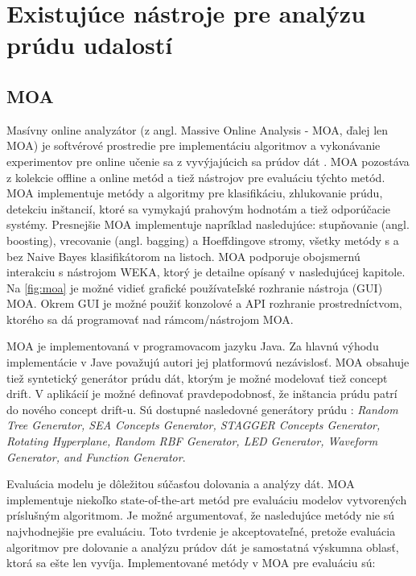 \chapter{Existujúce nástroje pre analýzu prúdu udalostí}
\label{Existujúce nástroje pre analýzu prúdu udalostí}


\section{MOA}
Masívny online analyzátor (z angl. Massive Online Analysis - MOA, ďalej len MOA) je softvérové prostredie pre implementáciu algoritmov a vykonávanie experimentov pre online učenie sa z vyvýjajúcich sa prúdov dát \citep{DBLP:journals/jmlr/BifetHKP10}. MOA pozostáva z kolekcie offline a online metód a tiež nástrojov pre evaluáciu týchto metód. MOA implementuje metódy a algoritmy pre klasifikáciu, zhlukovanie prúdu, detekciu inštancií, ktoré sa vymykajú prahovým hodnotám a tiež odporúčacie systémy. Presnejšie MOA implementuje napríklad nasledujúce: stupňovanie (angl. boosting), vrecovanie (angl. bagging) a Hoeffdingove stromy, všetky metódy s a bez Naive Bayes klasifikátorom na listoch. MOA podporuje obojsmernú interakciu s nástrojom WEKA, ktorý je detailne opísaný v nasledujúcej kapitole. Na \ref{fig:moa} je možné vidieť grafické používateľské rozhranie nástroja (GUI) MOA. Okrem GUI je možné použiť konzolové a API rozhranie prostredníctvom, ktorého sa dá programovať nad rámcom/nástrojom MOA.
\par
MOA je implementovaná v programovacom jazyku Java. Za hlavnú výhodu implementácie v Jave považujú autori jej platformovú nezávislosť. MOA obsahuje tiež syntetický generátor prúdu dát, ktorým je možné modelovať tiež concept drift. V aplikácií je možné definovať pravdepodobnosť, že inštancia prúdu patrí do nového concept drift-u. Sú dostupné nasledovné generátory prúdu \citep{DBLP:journals/jmlr/BifetHKP10}: \textit{Random Tree Generator, SEA Concepts Generator, STAGGER Concepts Generator, Rotating Hyperplane, Random RBF Generator, LED Generator, Waveform Generator, and Function Generator}.
\label{fig:moa}
\par
Evaluácia modelu je dôležitou súčasťou dolovania a analýzy dát. MOA implementuje niekoľko state-of-the-art metód pre evaluáciu modelov vytvorených príslušným algoritmom. Je možné argumentovať, že nasledujúce metódy nie sú najvhodnejšie pre evaluáciu. Toto tvrdenie je akceptovateľné, pretože evaluácia algoritmov pre dolovanie a analýzu prúdov dát je samostatná výskumna oblasť, ktorá sa ešte len vyvíja. Implementované metódy v MOA pre evaluáciu sú:
